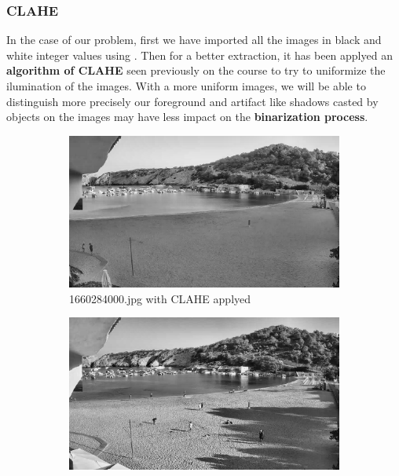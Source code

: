 \documentclass[10pt]{article}
\begin{document}
\subsubsection*{CLAHE}

In the case of our problem, first we have imported all the images in black and white integer values using . Then for a better extraction, it has been applyed an \textbf{algorithm of CLAHE} seen previously on the course to try to uniformize the ilumination of the images. With a more uniform images, we will be able to distinguish more precisely our foreground and artifact like shadows casted by objects on the images may have less impact on the \textbf{binarization process}.

\begin{figure}[h]
  \centering %
  \begin{subfigure}{0.25\textwidth}
    \includegraphics[width=\linewidth]{img/equ/1660284000.jpg}
    \caption{1660284000.jpg with CLAHE applyed}
    \label{fig:1}
  \end{subfigure}\hfil %
  \begin{subfigure}{0.25\textwidth}
    \includegraphics[width=\linewidth]{img/equ/1660287600.jpg}

\end{subfigure}
\end{figure}
\end{document}
